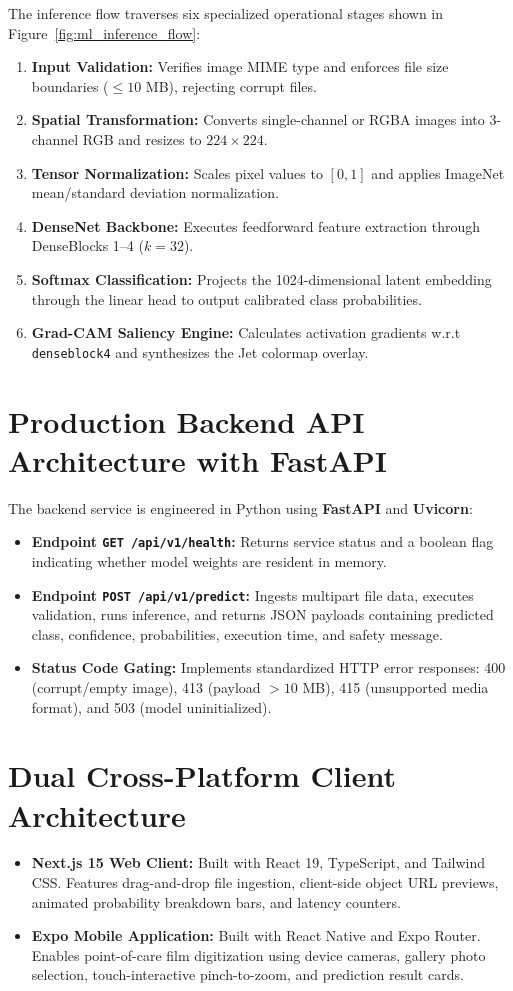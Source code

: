 \documentclass[12pt,a4paper]{report}
\begin{document}
The inference flow traverses six specialized operational stages shown in Figure~\ref{fig:ml_inference_flow}:
\begin{enumerate}
    \item \textbf{Input Validation:} Verifies image MIME type and enforces file size boundaries ($\le 10$ MB), rejecting corrupt files.
    \item \textbf{Spatial Transformation:} Converts single-channel or RGBA images into 3-channel RGB and resizes to $224 \times 224$.
    \item \textbf{Tensor Normalization:} Scales pixel values to $[0, 1]$ and applies ImageNet mean/standard deviation normalization.
    \item \textbf{DenseNet Backbone:} Executes feedforward feature extraction through DenseBlocks 1--4 ($k=32$).
    \item \textbf{Softmax Classification:} Projects the 1024-dimensional latent embedding through the linear head to output calibrated class probabilities.
    \item \textbf{Grad-CAM Saliency Engine:} Calculates activation gradients w.r.t \texttt{denseblock4} and synthesizes the Jet colormap overlay.
\end{enumerate}

\section{Production Backend API Architecture with FastAPI}
The backend service is engineered in Python using \textbf{FastAPI} and \textbf{Uvicorn}:
\begin{itemize}
    \item \textbf{Endpoint \texttt{GET /api/v1/health}:} Returns service status and a boolean flag indicating whether model weights are resident in memory.
    \item \textbf{Endpoint \texttt{POST /api/v1/predict}:} Ingests multipart file data, executes validation, runs inference, and returns JSON payloads containing predicted class, confidence, probabilities, execution time, and safety message.
    \item \textbf{Status Code Gating:} Implements standardized HTTP error responses: 400 (corrupt/empty image), 413 (payload $>10$ MB), 415 (unsupported media format), and 503 (model uninitialized).
\end{itemize}

\section{Dual Cross-Platform Client Architecture}
\begin{itemize}
    \item \textbf{Next.js 15 Web Client:} Built with React 19, TypeScript, and Tailwind CSS. Features drag-and-drop file ingestion, client-side object URL previews, animated probability breakdown bars, and latency counters.
    \item \textbf{Expo Mobile Application:} Built with React Native and Expo Router. Enables point-of-care film digitization using device cameras, gallery photo selection, touch-interactive pinch-to-zoom, and prediction result cards.
\end{itemize}
\end{document}
